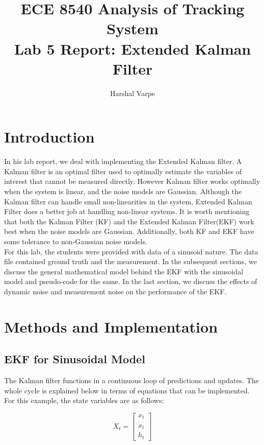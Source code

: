 \documentclass{article}
\author{ Harshal Varpe}
\title{ECE 8540 Analysis of Tracking System\\
\Large Lab 5 Report: Extended Kalman Filter }
\begin{document}
\maketitle

\section{Introduction}\label{sec:intro}

In his lab report, we deal with implementing the Extended Kalman filter. A Kalman filter is an optimal filter used to optimally estimate the variables of interest that cannot be measured directly.
However Kalman filter works optimally when the system is linear, and the noise models are Gaussian. Although the Kalman filter can handle small non-linearities in the system, Extended Kalman Filter does a better job at handling non-linear systems. It is worth mentioning that both the Kalman Filter (KF) and the Extended Kalman Filter(EKF) work best when the noise models are Gaussian. Additionally, both KF  and EKF have some tolerance to non-Gaussian noise models.\\
For this lab, the students were provided with data of a sinusoid nature. The data file contained ground truth and the measurement. In the subsequent sections, we discuss the general mathematical model behind the EKF with the sinusoidal model and pseudo-code for the same. In the last section, we discuss the effects of dynamic noise and measurement noise on the performance of the EKF.\\

\section{Methods and Implementation}\label{sec:meth}
\subsection{EKF for Sinusoidal Model}
The Kalman filter functions in a continuous loop of predictions and updates. The whole cycle is explained below in terms of equations that can be implemented. For this example, the state variables are as follows:

\begin{equation}
\label{eqn:one}
X_t = \begin{bmatrix}
x_t \\
\dot{x}_t \\
h_t
\end{bmatrix}
\end{equation}
\end{document}
